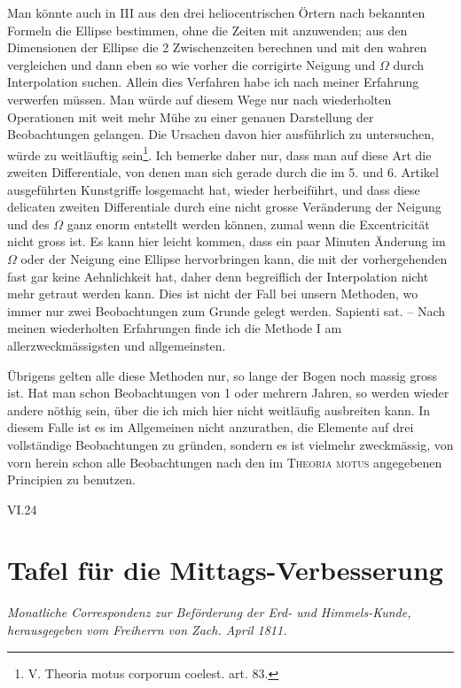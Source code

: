 \documentclass[10pt,a4paper]{article}
\begin{document}
Man könnte auch in III aus den drei heliocentrischen Örtern nach bekannten Formeln die Ellipse bestimmen, ohne die Zeiten mit anzuwenden; aus den Dimensionen der Ellipse die 2 Zwischenzeiten berechnen und mit den wahren vergleichen und dann eben so wie vorher die corrigirte Neigung und $\Omega$ durch Interpolation suchen. Allein dies Verfahren habe ich nach meiner Erfahrung verwerfen müssen. Man würde auf diesem Wege nur nach wiederholten Operationen mit weit mehr Mühe zu einer genauen Darstellung der Beobachtungen gelangen. Die Ursachen davon hier ausführlich zu untersuchen, würde zu weitläuftig sein\footnote{V. Theoria motus corporum coelest. art. 83.}. Ich bemerke daher nur, dass man auf diese Art die zweiten Differentiale, von denen man sich gerade durch die im 5. und 6. Artikel ausgeführten Kunstgriffe losgemacht hat, wieder herbeiführt, und dass diese delicaten zweiten Differentiale durch eine nicht grosse Veränderung der Neigung und des $\Omega$ ganz enorm entstellt werden können, zumal wenn die Excentricität nicht gross ist. Es kann hier leicht kommen, dass ein paar Minuten Änderung im $\Omega$ oder der Neigung eine Ellipse hervorbringen kann, die mit der vorhergehenden fast gar keine Aehnlichkeit hat, daher denn begreiflich der Interpolation nicht mehr getraut werden kann. Dies ist nicht der Fall bei unsern Methoden, wo immer nur zwei Beobachtungen zum Grunde gelegt werden. Sapienti sat. -- Nach meinen wiederholten Erfahrungen finde ich die Methode I am allerzweckmässigsten und allgemeinsten.

Übrigens gelten alle diese Methoden nur, so lange der Bogen noch massig gross ist. Hat man schon Beobachtungen von 1 oder mehrern Jahren, so werden wieder andere nöthig sein, über die ich mich hier nicht weitläufig ausbreiten kann. In diesem Falle ist es im Allgemeinen nicht anzurathen, die Elemente auf drei vollständige Beobachtungen zu gründen, sondern es ist vielmehr zweckmässig, von vorn herein schon alle Beobachtungen nach den im \textsc{Theoria motus} angegebenen Principien zu benutzen.

\vspace{1em}
\noindent\textsc{VI.}\hfill 24

\clearpage
\section*{Tafel für die Mittags-Verbesserung}

\begin{center}
\small
\textit{Monatliche Correspondenz zur Beförderung der Erd- und Himmels-Kunde,}\\
\textit{herausgegeben vom Freiherrn von Zach. April 1811.}
\end{center}
\end{document}
